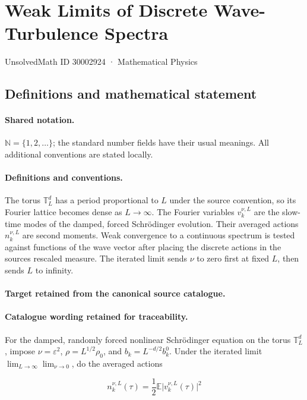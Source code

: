 \documentclass[11pt]{article}
\begin{document}
\setcounter{section}{30002923}
\section{Weak Limits of Discrete Wave-Turbulence Spectra}\label{30002924}
{\small UnsolvedMath ID 30002924 · Mathematical Physics}
\subsection{Definitions and mathematical statement}

\paragraph{Shared notation.}$\mathbb N=\{1,2,\ldots\}$; the standard number fields have their usual meanings. All additional conventions are stated locally.


\paragraph{Definitions and conventions.}
The torus $\mathbb T_L^d$ has a period proportional to $L$ under the source convention, so its Fourier lattice becomes dense as $L\to\infty$. The Fourier variables $v_k^{\nu,L}$ are the slow-time modes of the damped, forced Schrödinger evolution. Their averaged actions $n_k^{\nu,L}$ are second moments. Weak convergence to a continuous spectrum is tested against functions of the wave vector after placing the discrete actions in the source\textquotesingle s rescaled measure. The iterated limit sends $\nu$ to zero first at fixed $L$, then sends $L$ to infinity.

\paragraph{Target retained from the canonical source catalogue.}
\paragraph{Catalogue wording retained for traceability.}
For the damped, randomly forced nonlinear Schrödinger equation on the torus $\mathbb T_L^d$, impose $\nu=\varepsilon^2$, $\rho=L^{1/2}\rho_0$, and $b_k=L^{-d/2}b_k^0$. Under the iterated limit $\lim_{L\to\infty}\lim_{\nu\to0}$, do the averaged actions

$$n_k^{\nu,L}(\tau)=\frac12\mathbb E\lvert v_k^{\nu,L}(\tau)\rvert^2$$
\end{document}
